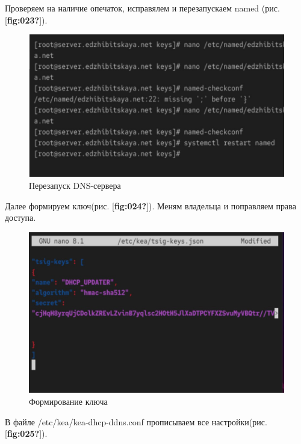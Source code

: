 \documentclass[
  english,
  russian,
  12pt,
  a4paper,
  DIV=11,
  numbers=noendperiod]{scrreprt}
\begin{document}
Проверяем на наличие опечаток, исправялем и перезапускаем named (рис.
{[}\textbf{fig:023?}{]}).

\begin{figure}

{\centering \includegraphics[width=0.7\linewidth,height=\textheight,keepaspectratio]{image/23.jpg}

}

\caption{Перезапуск DNS-сервера}

\end{figure}%

Далее формируем ключ(рис. {[}\textbf{fig:024?}{]}). Меням владельца и
поправляем права доступа.

\begin{figure}

{\centering \includegraphics[width=0.7\linewidth,height=\textheight,keepaspectratio]{image/24.jpg}

}

\caption{Формирование ключа}

\end{figure}%

В файле /etc/kea/kea-dhcp-ddns.conf прописываем все настройки(рис.
{[}\textbf{fig:025?}{]}).
\end{document}
